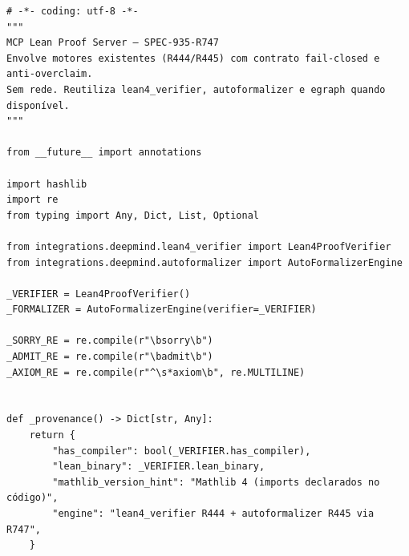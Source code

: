\documentclass[12pt,openany,oneside,a4paper,brazil,chapter=TITLE]{abntex2}
\begin{document}
\begin{lstlisting}
# -*- coding: utf-8 -*-
"""
MCP Lean Proof Server — SPEC-935-R747
Envolve motores existentes (R444/R445) com contrato fail-closed e anti-overclaim.
Sem rede. Reutiliza lean4_verifier, autoformalizer e egraph quando disponível.
"""

from __future__ import annotations

import hashlib
import re
from typing import Any, Dict, List, Optional

from integrations.deepmind.lean4_verifier import Lean4ProofVerifier
from integrations.deepmind.autoformalizer import AutoFormalizerEngine

_VERIFIER = Lean4ProofVerifier()
_FORMALIZER = AutoFormalizerEngine(verifier=_VERIFIER)

_SORRY_RE = re.compile(r"\bsorry\b")
_ADMIT_RE = re.compile(r"\badmit\b")
_AXIOM_RE = re.compile(r"^\s*axiom\b", re.MULTILINE)


def _provenance() -> Dict[str, Any]:
    return {
        "has_compiler": bool(_VERIFIER.has_compiler),
        "lean_binary": _VERIFIER.lean_binary,
        "mathlib_version_hint": "Mathlib 4 (imports declarados no código)",
        "engine": "lean4_verifier R444 + autoformalizer R445 via R747",
    }



\end{lstlisting}
\end{document}
